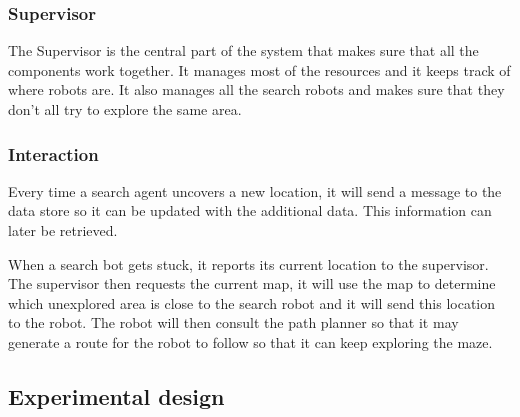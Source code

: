 \subsubsection{Supervisor}
The Supervisor is the central part of the system that makes sure that all
the components work together. It manages most of the resources and it keeps
track of where robots are. It also manages all the search robots and makes sure
that they don't all try to explore the same area.

\subsubsection{Interaction}
Every time a search agent uncovers a new location, it will send a message to
the data store so it can be updated with the additional data. This information
can later be retrieved.

When a search bot gets stuck, it reports its current location to the
supervisor. The supervisor then requests the current map, it will use the map
to determine which unexplored area is close to the search robot and it will
send this location to the robot. The robot will then consult the path planner
so that it may generate a route for the robot to follow so that it can keep
exploring the maze.

\subsection{Experimental design}
